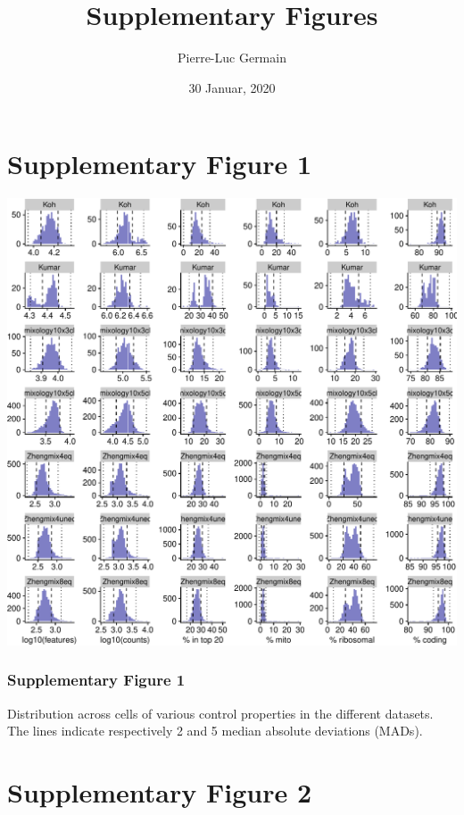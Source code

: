 \documentclass[]{article}
\title{Supplementary Figures}
\author{Pierre-Luc Germain}
\date{30 Januar, 2020}
\begin{document}
\maketitle

{
\setcounter{tocdepth}{2}
\tableofcontents
}
\newpage

\hypertarget{supplementary-figure-1}{%
\section{Supplementary Figure 1}\label{supplementary-figure-1}}

\includegraphics{supp_figures_files/figure-latex/dist_cell_properties-1.pdf}

\hypertarget{supplementary-figure-1-1}{%
\subsubsection{Supplementary Figure 1}\label{supplementary-figure-1-1}}

Distribution across cells of various control properties in the different
datasets. The lines indicate respectively 2 and 5 median absolute
deviations (MADs).

\newpage

\hypertarget{supplementary-figure-2}{%
\section{Supplementary Figure 2}\label{supplementary-figure-2}}
\end{document}
